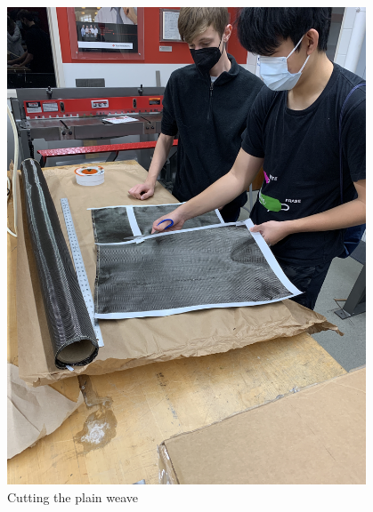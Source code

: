 \begin{figure}[ht]
\centering
\begin{minipage}[b]{.48\textwidth}
  \centering
  \includegraphics[width=0.95\textwidth]{Meetings/December/12-19-21/12-19-21_Hardware_Figure3 - Nathan Forrer.JPG}
  \caption{Cutting the plain weave}
  \label{fig:121921_3}
\end{minipage}%
\hfill%
\begin{minipage}[b]{.48\textwidth}
  \centering

\end{minipage}
\end{figure}
